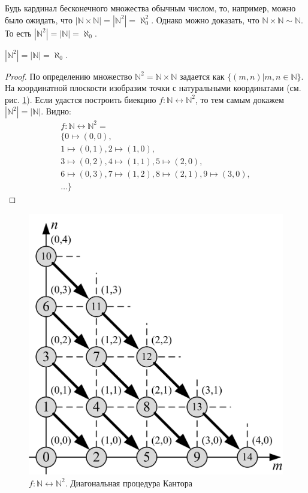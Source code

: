 Будь кардинал бесконечного множества обычным числом, то, например, можно было ожидать, что $|\mathbb{N}\times\mathbb{N}|=|\mathbb{N}^2|=\aleph_0^2$. Однако можно доказать, что $\mathbb{N}\times\mathbb{N}\sim\mathbb{N}$. То есть $|\mathbb{N}^2|=|\mathbb{N}|=\aleph_0$. 
\begin{exampl}
    $|\mathbb{N}^2|=|\mathbb{N}|=\aleph_0$.
\end{exampl}
\begin{proof}
    По определению множество $\mathbb{N}^2=\mathbb{N}\times\mathbb{N}$ задается как $\{(m,n)|m,n\in\mathbb{N}\}$. На координатной плоскости изобразим точки с натуральными координатами (см. рис. \ref{fig:diagonalKantor}). Если удастся построить биекцию $f:\mathbb{N}\leftrightarrow\mathbb{N}^2$, то тем самым докажем $|\mathbb{N}^2|=|\mathbb{N}|$. Видно:
    \[
        \begin{split}
            f:\mathbb{N}\leftrightarrow\mathbb{N}^2=\\
            \{
                0\mapsto(0,0),\\
                1\mapsto(0,1),
                2\mapsto(1,0),\\
                3\mapsto(0,2),
                4\mapsto(1,1),
                5\mapsto(2,0),\\
                6\mapsto(0,3),
                7\mapsto(1,2),
                8\mapsto(2,1),
                9\mapsto(3,0),\\ \ldots
            \}
        \end{split}
    \]
\end{proof}

\begin{figure}
    \centering
    \includegraphics{fig/diagonalKantor}
    \caption{$f:\mathbb{N}\leftrightarrow\mathbb{N}^2$. Диагональная процедура Кантора}
    \label{fig:diagonalKantor}
\end{figure} 


